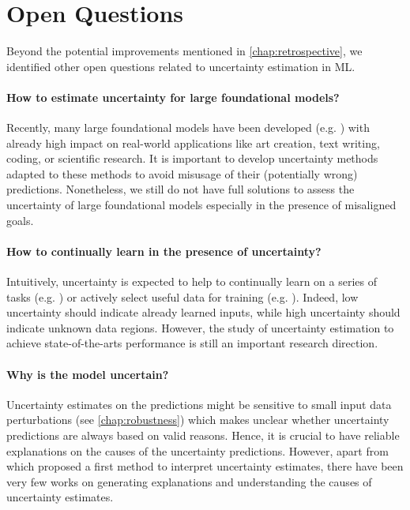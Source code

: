 \section{Open Questions}

Beyond the potential improvements mentioned in \cref{chap:retrospective}, we identified other open questions related to uncertainty estimation in ML.

\paragraph{How to estimate uncertainty for large foundational models?} Recently, many large foundational models have been developed (e.g. \cite{gpt, rombach2021highresolution, galactica}) with already high impact on real-world applications like art creation, text writing, coding, or scientific research. It is important to develop uncertainty methods adapted to these methods to avoid misusage of their (potentially wrong) predictions. Nonetheless, we still do not have full solutions to assess the uncertainty of large foundational models especially in the presence of misaligned goals.

\paragraph{How to continually learn in the presence of uncertainty?} Intuitively, uncertainty is expected to help to continually learn on a series of tasks (e.g. \cite{ebrahimi2020uncertainty-guided,khan2021knowledge,farquhar2018towards}) or actively select useful data for training (e.g. \cite{jain2022biological,gal2017bald,kirsch2019batch,kirsch2021simple,tata2022can}). Indeed, low uncertainty should indicate already learned inputs, while high uncertainty should indicate unknown data regions. However, the study of uncertainty estimation to achieve state-of-the-arts performance is still an important research direction.

\paragraph{Why is the model uncertain?} Uncertainty estimates on the predictions might be sensitive to small input data perturbations (see \cref{chap:robustness}) which makes unclear whether uncertainty predictions are always based on valid reasons. Hence, it is crucial to have reliable explanations on the causes of the uncertainty predictions. However, apart from \cite{antoran2021getting} which proposed a first method to interpret uncertainty estimates, there have been very few works on generating explanations and understanding the causes of uncertainty estimates. 

